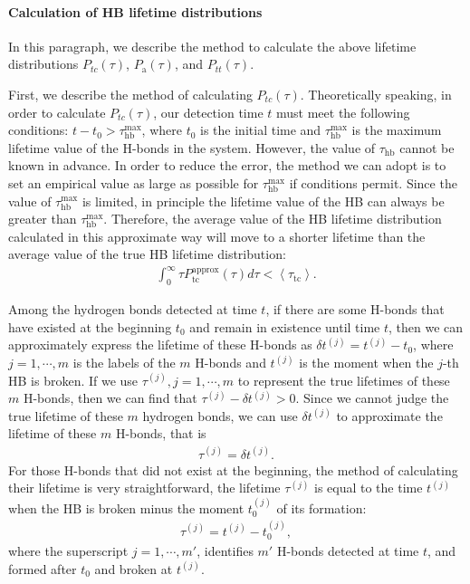 {\paragraph{Calculation of HB lifetime distributions}
In this paragraph, we describe the method to calculate the above lifetime distributions $P_{tc}(\tau)$, $P_\text{a}(\tau)$, and $P_{tt}(\tau)$.

First, we describe the method of calculating $P_{tc}(\tau)$.
Theoretically speaking, in order to calculate $P_{tc}(\tau)$, our detection time $t$ must meet the following conditions: 
$t-t_0 > \tau_\text{hb}^{\max}$, where $t_0$ is the initial time and $\tau_\text{hb}^{\max}$ is the maximum lifetime value of the H-bonds in the system. 
However, the value of $\tau_\text{hb}$ cannot be known in advance. 
In order to reduce the error, the method we can adopt is to set an empirical value as large as possible for
 $\tau_\text{hb}^{\max}$ if conditions permit. Since the value of $\tau_\text{hb}^{\max}$ is limited, in principle the lifetime value of the HB 
can always be greater than $\tau_\text{hb}^{\max}$. 
Therefore, the average value of the HB lifetime distribution 
calculated in this approximate way will move to a shorter lifetime than the average value of the true HB lifetime distribution:
\begin{eqnarray}
\int_{0}^{\infty} \tau P_{\mathrm{tc}}^{\mathrm{approx}}(\tau) d \tau < \left\langle\tau_{\mathrm{tc}}\right\rangle.
\label{eq:upper_bound_1_for_tau_tc}
\end{eqnarray} 

Among the hydrogen bonds detected at time $t$, if there are some H-bonds that have existed at the beginning $t_0$ and 
remain in existence until time $t$, then we can approximately express the lifetime of these H-bonds as $\delta t^{(j)}=t^{(j)} -t_0$, 
where $j=1,\cdots, m$ is the labels of the $m$ H-bonds and $t^{(j)}$ is the moment when the $j$-th HB is broken. 
If we use $\tau^{(j)},j=1,\cdots,m$ to represent the true lifetimes of these $m$ H-bonds,
then we can find that $\tau^{(j)}-\delta t^{(j)} >0 $.
Since we cannot judge the true lifetime of these $m$ hydrogen bonds, we can use $\delta t^{(j)}$ to approximate 
the lifetime of these $m$ H-bonds, that is
\begin{eqnarray}
\tau^{(j)} = \delta t^{(j)}.
\end{eqnarray}
For those H-bonds that did not exist at the beginning, the method of calculating their lifetime is very straightforward, 
the lifetime $\tau^{(j)}$ is equal to the time $t^{(j)}$ when the HB is broken minus the moment $t^{{(j)}}_0$ of its formation:
\begin{eqnarray}
\tau^{(j)} = t^{(j)} - t^{(j)}_0,
\end{eqnarray} 
where the superscript $j = 1, \cdots, m'$, identifies $m'$ H-bonds 
detected at time $t$, and
formed after $t_0$ and broken at $t^{(j)}$.

}
